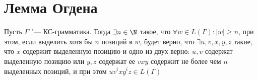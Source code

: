 
\section{Лемма Огдена}
\begin{theorem}

Пусть $\Gamma$ "--- КС-грамматика. Тогда $\exists n \in \N$ такое, что $\forall w \in L(\Gamma) \colon |w| \geq n$, 
при этом, если выделить хотя бы $n$ позиций в $w$, будет верно, что $\exists u, v, x, y, z$ такие, что
$x$ содержит выделенную позицию и
одно из двух верно: $u, v$ содержат выделенную позицию или $y, z$ содержат ее
$vxy$ содержит не более чем $n$ выделенных позиций, и при этом
$uv^ixy^iz \in L(\Gamma)$ 

\end{theorem}

